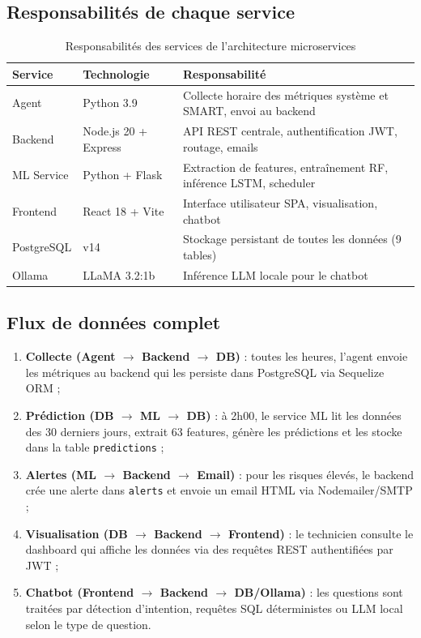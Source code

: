 \subsection{Responsabilités de chaque service}

\begin{table}[H]
\centering
\caption{Responsabilités des services de l'architecture microservices}
\begin{tabularx}{\textwidth}{|l|l|X|}
\hline
\rowcolor{lightblue}
\textbf{Service} & \textbf{Technologie} & \textbf{Responsabilité} \\
\hline
Agent & Python 3.9 & Collecte horaire des métriques système et SMART, envoi au backend \\
\hline
Backend & Node.js 20 + Express & API REST centrale, authentification JWT, routage, emails \\
\hline
ML Service & Python + Flask & Extraction de features, entraînement RF, inférence LSTM, scheduler \\
\hline
Frontend & React 18 + Vite & Interface utilisateur SPA, visualisation, chatbot \\
\hline
PostgreSQL & v14 & Stockage persistant de toutes les données (9 tables) \\
\hline
Ollama & LLaMA 3.2:1b & Inférence LLM locale pour le chatbot \\
\hline
\end{tabularx}
\end{table}

\subsection{Flux de données complet}

\begin{enumerate}
  \item \textbf{Collecte (Agent $\rightarrow$ Backend $\rightarrow$ DB)} : toutes les heures,
        l'agent envoie les métriques au backend qui les persiste dans PostgreSQL via
        Sequelize ORM ;
  \item \textbf{Prédiction (DB $\rightarrow$ ML $\rightarrow$ DB)} : à 2h00, le service ML
        lit les données des 30 derniers jours, extrait 63 features, génère les prédictions
        et les stocke dans la table \texttt{predictions} ;
  \item \textbf{Alertes (ML $\rightarrow$ Backend $\rightarrow$ Email)} : pour les risques
        élevés, le backend crée une alerte dans \texttt{alerts} et envoie un email HTML
        via Nodemailer/SMTP ;
  \item \textbf{Visualisation (DB $\rightarrow$ Backend $\rightarrow$ Frontend)} : le
        technicien consulte le dashboard qui affiche les données via des requêtes REST
        authentifiées par JWT ;
  \item \textbf{Chatbot (Frontend $\rightarrow$ Backend $\rightarrow$ DB/Ollama)} : les
        questions sont traitées par détection d'intention, requêtes SQL déterministes
        ou LLM local selon le type de question.
\end{enumerate}

